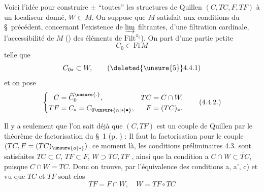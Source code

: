   Voici l'idée pour construire $\pm$ ``toutes'' les  structures de Quillen  $(C,TC,F,TF)$  à un localiseur donné, $W\subset M$. On suppose que $M$ satisfait aux conditions du \S\ précédent, concernant l'existence de $\varinjlim$ filtrantes, d'une filtration cardinale, l'accessibilité de $M$ ()  des éléments de $\mathrm{Filt}^{\pi_0}$). On part d'une partie petite
\[
C_0\subset\mathrm{Fl}\,M
\]
telle que
\[
C_{0*}\subset W,
\tag*{(\deleted{\unsure{5}}4.4.1)}
\]
et on pose
\[
\left\{\begin{aligned}
C&=\widetilde C_0^{\unsure{.}},& TC&=C\cap W.\\
TF&=C_*=C_{0\unsure{\alpha|*|\bullet}},& F&=(TC)_*.
\end{aligned}\right.
\tag*{(4.4.2.)}
\]

Il y a    seulement   que l'on sait déjà que $(C,TF)$ est un couple de Quillen par le théorème de factorisation du \S\ 1 (p. ) : Il faut la factorisation pour le couple $(TC,F=(TC)_{\unsure{\alpha|*}})$.  ce moment là, les conditions préliminaires  4.3. sont satisfaites $TC\subset C$, $TF\subset F$, $W\supset TC,TF$ , ainsi que la condition a $C\cap W\subset\widetilde{TC}$, puisque $C\cap W=TC$. Donc on trouve, par l'équivalence des conditions a, a', c) et vu que $TC$ et $TF$ sont clos
\[
TF=F\cap W,\quad W=TF\circ TC
\]
